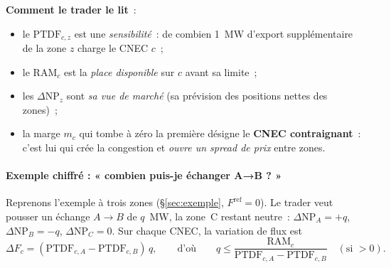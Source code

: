 \documentclass[11pt,a4paper]{article}
\newcommand{\NP}{\mathrm{NP}}
\newcommand{\PTDF}{\mathrm{PTDF}}
\newcommand{\RAM}{\mathrm{RAM}}
\newcommand{\Fref}{F^{\mathrm{ref}}}
\begin{document}
\noindent\textbf{Comment le trader le lit}~:
\begin{itemize}[nosep,leftmargin=1.4em]
  \item le $\PTDF_{c,z}$ est une \emph{sensibilité}~: de combien 1~MW
        d'export supplémentaire de la zone $z$ charge le CNEC $c$~;
  \item le $\RAM_c$ est la \emph{place disponible} sur $c$ avant sa limite~;
  \item les $\Delta\NP_z$ sont \emph{sa vue de marché} (sa prévision des
        positions nettes des zones)~;
  \item la marge $m_c$ qui tombe à zéro la première désigne le \textbf{CNEC
        contraignant}~: c'est lui qui crée la congestion et \emph{ouvre un
        spread de prix} entre zones.
\end{itemize}

\begin{center}
\end{center}

\paragraph{Exemple chiffré : « combien puis-je échanger A→B ? »}
Reprenons l'exemple à trois zones (\S\ref{sec:exemple}, $\Fref=0$). Le trader
veut pousser un échange $A\!\to\!B$ de $q$~MW, la zone~C restant neutre~:
$\Delta\NP_A=+q$, $\Delta\NP_B=-q$, $\Delta\NP_C=0$. Sur chaque CNEC, la
variation de flux est
\[
  \Delta F_c=(\PTDF_{c,A}-\PTDF_{c,B})\,q ,
  \qquad\text{d'où}\qquad
  q \le \frac{\RAM_c}{\PTDF_{c,A}-\PTDF_{c,B}}\quad(\text{si }>0).
\]
\end{document}
